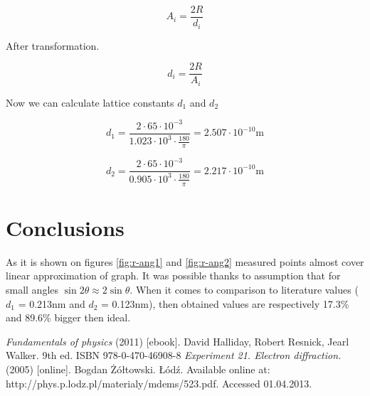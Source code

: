 \documentclass[a4paper,12pt]{article}
\begin{document}
\begin{equation}
    A_i = \frac{2R}{d_i} \label{eq:d1}
\end{equation}

After transformation.

\begin{equation}
    d_i = \frac{2R}{A_i}
\end{equation}

Now we can calculate lattice constants $d_1$ and $d_2$

\begin{displaymath}
    d_1 = \frac{2\cdot 65 \cdot 10^{-3}}{1.023 \cdot 10^{3} \cdot \frac{180}{\pi}} = 2.507 \cdot 10^{-10}\mathrm{m} 
\end{displaymath}

\begin{displaymath}
    d_2 = \frac{2\cdot 65 \cdot 10^{-3}}{0.905 \cdot 10^{3} \cdot \frac{180}{\pi}} = 2.217 \cdot 10^{-10}\mathrm{m}
\end{displaymath}


\section{Conclusions}
As it is shown on figures \ref{fig:r-ang1} and \ref{fig:r-ang2} measured points almost cover linear approximation of graph. It was possible thanks to assumption that for small angles $\sin 2 \theta \approx 2 \sin \theta$. When it comes to comparison to literature values ($d_1$ = 0.213nm and $d_2$ = 0.123nm), then obtained values are respectively 17.3\% and 89.6\% bigger then ideal.


\begin{thebibliography}{9}
    \emph{Fundamentals of physics} (2011) [ebook]. David Halliday, Robert Resnick, Jearl Walker. 9th ed. ISBN 978-0-470-46908-8
    \emph{Experiment 21. Electron diffraction.} (2005) [online]. Bogdan Żółtowski. Łódź. Available online at: http://phys.p.lodz.pl/materialy/mdems/523.pdf. Accessed 01.04.2013.
\end{thebibliography}
\end{document}

